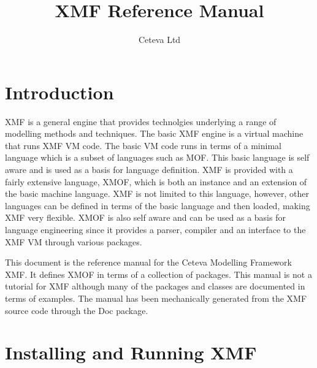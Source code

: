 \documentclass[a4paper]{article}
\title{XMF Reference Manual}
\author{Ceteva Ltd}
\begin{document}
\maketitle
\tableofcontents

\section{Introduction}

XMF is a general engine that provides technolgies underlying a range of modelling
methods and techniques. The basic XMF engine is a virtual machine that runs
XMF VM code. The basic VM code runs in terms of a minimal language which is
a subset of languages such as MOF. This basic language is self aware and is used
as a basis for language definition. XMF is provided with a fairly extensive language, XMOF,
which is both an instance and an extension of the basic machine language. XMF is
not limited to this language, however, other languages can be defined in terms 
of the basic language and then loaded, making XMF very flexible. XMOF is also self aware
and can be used as a basis for language engineering since it provides a parser,
compiler and an interface to the XMF VM through various packages.

This document is the reference manual for the Ceteva Modelling Framework XMF. It
defines XMOF in terms of a collection of packages. This manual is not a tutorial 
for XMF although many of the packages and classes are documented in terms of examples.
The manual has been mechanically generated from the XMF source code through the Doc 
package.

\section{Installing and Running XMF}
\end{document}
